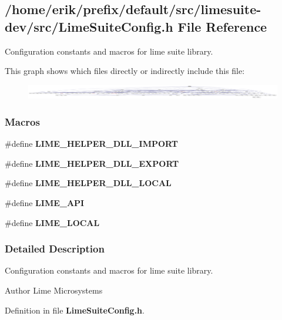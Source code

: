\subsection{/home/erik/prefix/default/src/limesuite-\/dev/src/\+Lime\+Suite\+Config.h File Reference}
\label{LimeSuiteConfig_8h}


Configuration constants and macros for lime suite library.  


This graph shows which files directly or indirectly include this file\+:
\nopagebreak
\begin{figure}[H]
\begin{center}
\leavevmode
\includegraphics[width=350pt]{df/d25/LimeSuiteConfig_8h__dep__incl}
\end{center}
\end{figure}
\subsubsection*{Macros}
\begin{DoxyCompactItemize}
\item 
\#define {\bf L\+I\+M\+E\+\_\+\+H\+E\+L\+P\+E\+R\+\_\+\+D\+L\+L\+\_\+\+I\+M\+P\+O\+RT}
\item 
\#define {\bf L\+I\+M\+E\+\_\+\+H\+E\+L\+P\+E\+R\+\_\+\+D\+L\+L\+\_\+\+E\+X\+P\+O\+RT}
\item 
\#define {\bf L\+I\+M\+E\+\_\+\+H\+E\+L\+P\+E\+R\+\_\+\+D\+L\+L\+\_\+\+L\+O\+C\+AL}
\item 
\#define {\bf L\+I\+M\+E\+\_\+\+A\+PI}
\item 
\#define {\bf L\+I\+M\+E\+\_\+\+L\+O\+C\+AL}
\end{DoxyCompactItemize}


\subsubsection{Detailed Description}
Configuration constants and macros for lime suite library. 

\begin{DoxyAuthor}{Author}
Lime Microsystems 
\end{DoxyAuthor}


Definition in file {\bf Lime\+Suite\+Config.\+h}.



